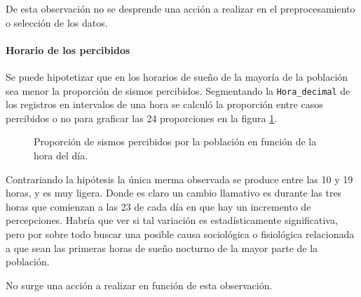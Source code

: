 \documentclass[a4paper]{report}
\begin{document}
De esta observación no se desprende una acción a realizar en el preprocesamiento o selección de los datos.


\paragraph{Horario de los percibidos}
Se puede hipotetizar que en los horarios de sueño de la mayoría de la población sea menor la proporción de sismos percibidos.
Segmentando la \verb'Hora_decimal' de los registros en intervalos de una hora se calculó la proporción entre casos percibidos o no para graficar las 24 proporciones en la figura \ref{fig:histograma_percibidos_por_hora}. 
\begin{figure}[!ht]
\centering

\caption{Proporción de sismos percibidos por la población en función de la hora del día.}
\label{fig:histograma_percibidos_por_hora}
\end{figure}

Contrariando la hipótesis la única merma observada se produce entre las 10 y 19 horas, y es muy ligera.
Donde es claro un cambio llamativo es durante las tres horas que comienzan a las 23 de cada día en que hay un incremento de percepciones. 
Habría que ver si tal variación es estadísticamente significativa, pero por sobre todo buscar una posible causa sociológica o fisiológica relacionada a que sean las primeras horas de sueño nocturno de la mayor parte de la población.

No surge una acción a realizar en función de esta observación.
\end{document}
